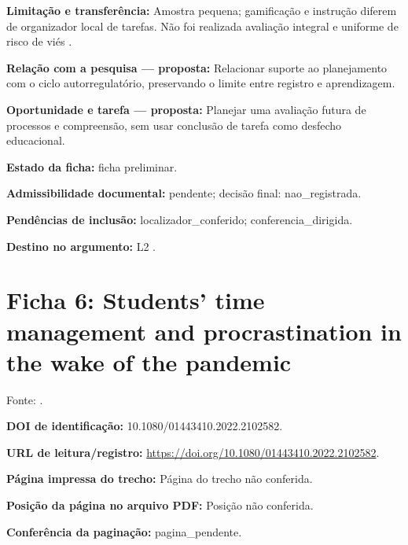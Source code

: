 \noindent\textbf{Limitação e transferência:} Amostra pequena; gamificação e instrução diferem de organizador local de tarefas. Não foi realizada avaliação integral e uniforme de risco de viés \citep{education_chen2024}.\par\medskip

\noindent\textbf{Relação com a pesquisa — proposta:} Relacionar suporte ao planejamento com o ciclo autorregulatório, preservando o limite entre registro e aprendizagem.\par\medskip

\noindent\textbf{Oportunidade e tarefa — proposta:} Planejar uma avaliação futura de processos e compreensão, sem usar conclusão de tarefa como desfecho educacional.\par\medskip

\noindent\textbf{Estado da ficha:} ficha preliminar.\par\medskip

\noindent\textbf{Admissibilidade documental:} pendente; decisão final: nao\_registrada.\par\medskip

\noindent\textbf{Pendências de inclusão:} localizador\_conferido; conferencia\_dirigida.\par\medskip

\noindent\textbf{Destino no argumento:} L2 .

\clearpage\section*{Ficha 6: Students’ time management and procrastination in the wake of the pandemic}

Fonte: \citet{education_forstervold2022}.

\noindent\textbf{DOI de identificação:} 10.1080/01443410.2022.2102582.\par\medskip

\noindent\textbf{URL de leitura/registro:} \url{https://doi.org/10.1080/01443410.2022.2102582}.\par\medskip

\noindent\textbf{Página impressa do trecho:} Página do trecho não conferida.\par\medskip

\noindent\textbf{Posição da página no arquivo PDF:} Posição não conferida.\par\medskip

\noindent\textbf{Conferência da paginação:} pagina\_pendente.\par\medskip

